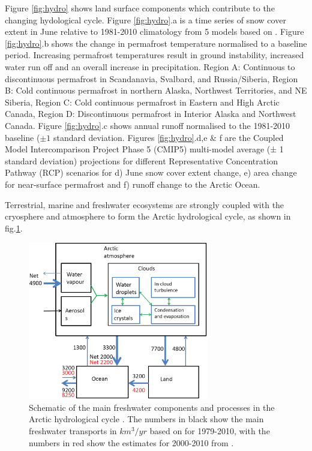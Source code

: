\documentclass[11pt, oneside]{article}
\begin{document}
Figure \ref{fig:hydro} shows land surface components which contribute to the changing hydological cycle. Figure \ref{fig:hydro}.a is a time series of snow cover extent in June relative to 1981-2010 climatology from 5 models based on . Figure \ref{fig:hydro}.b shows the change in permafrost temperature normalised to a baseline period. Increasing permafrost temperatures result in ground instability, increased water run off and an overall increase in precipitation. Region A: Continuous to discontinuous permafrost in Scandanavia, Svalbard, and Russia/Siberia, Region B: Cold continuous permafrost in northern Alaska, Northwest Territories, and NE Siberia, Region C: Cold continuous permafrost in Eastern and High Arctic Canada, Region D: Discontinuous permafrost in Interior Alaska and Northwest Canada. Figure \ref{fig:hydro}.c shows annual runoff normalised to the 1981-2010 baseline ($\pm 1$ standard deviation. Figures \ref{fig:hydro}.d,e \& f are the Coupled Model Intercomparison Project Phase 5 (CMIP5) multi-model average (± 1 standard deviation) projections for different Representative Concentration Pathway (RCP) scenarios for d) June snow cover extent change, e) area change for near-surface permafrost and f) runoff change to the Arctic Ocean. 

Terrestrial, marine and freshwater ecosystems are strongly coupled with the cryosphere and atmosphere to form the Arctic hydrological cycle, as shown in fig.\ref{fig:hydro_cycle}.  


\begin{figure}[h!]
\centering
\includegraphics[width=0.7\textwidth]{hydological_cycle.png}
\caption{Schematic of the main freshwater components and processes in the Arctic hydrological cycle \cite{vihma2016atmospheric}. The numbers in black show the main freshwater transports in $km^3/yr$ based on \cite{serreze2006large} for 1979-2010, with the numbers in red show the estimates for 2000-2010 from   \cite{haine2015arctic}. }\label{fig:hydro_cycle}
\end{figure}
\end{document}
